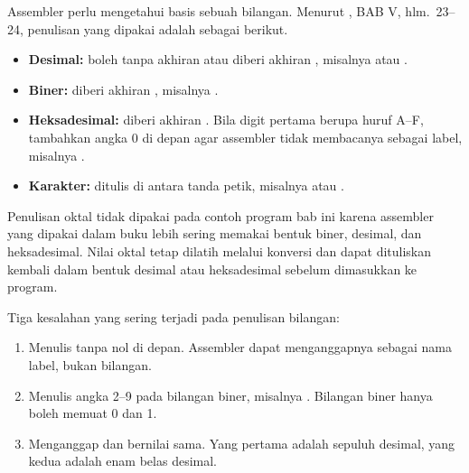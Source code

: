 Assembler perlu mengetahui basis sebuah bilangan. Menurut
\cite{sto2001}, BAB V, hlm.~23--24, penulisan yang dipakai adalah
sebagai berikut.

\begin{itemize}
    \item \textbf{Desimal:} boleh tanpa akhiran atau diberi akhiran
          , misalnya  atau .
    \item \textbf{Biner:} diberi akhiran , misalnya
          .
    \item \textbf{Heksadesimal:} diberi akhiran . Bila digit
          pertama berupa huruf A--F, tambahkan angka 0 di depan agar
          assembler tidak membacanya sebagai label, misalnya
          .
    \item \textbf{Karakter:} ditulis di antara tanda petik, misalnya
           atau .
\end{itemize}

Penulisan oktal tidak dipakai pada contoh program bab ini karena
assembler yang dipakai dalam buku lebih sering memakai bentuk biner,
desimal, dan heksadesimal. Nilai oktal tetap dilatih melalui konversi
dan dapat dituliskan kembali dalam bentuk desimal atau heksadesimal
sebelum dimasukkan ke program.

\begin{peringatanbox}
\vspace{1.1em}
Tiga kesalahan yang sering terjadi pada penulisan bilangan:
\begin{enumerate}
    \item Menulis  tanpa nol di depan. Assembler dapat
          menganggapnya sebagai nama label, bukan bilangan.
    \item Menulis angka 2--9 pada bilangan biner, misalnya
          . Bilangan biner hanya boleh memuat 0 dan 1.
    \item Menganggap  dan  bernilai sama. Yang
          pertama adalah sepuluh desimal, yang kedua adalah enam belas
          desimal.
\end{enumerate}
\end{peringatanbox}
